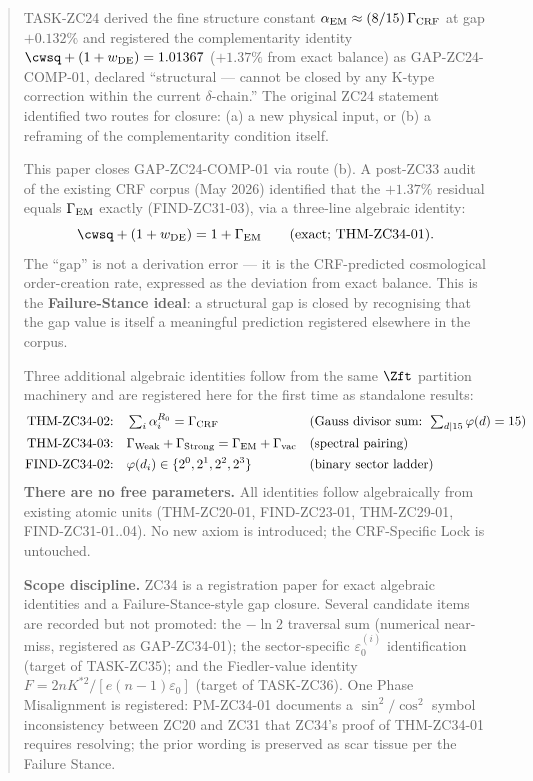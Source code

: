 \documentclass[12pt, a4paper]{article}
\begin{document}
\begin{abstract}
\sloppy
TASK-ZC24 derived the fine structure constant
$\alpha_{\rm EM} \approx (8/15)\,\Gamma_{\rm CRF}$ at gap $+0.132\%$
and registered the complementarity identity
$\cwsq + (1+w_{\rm DE}) = 1.01367$ ($+1.37\%$ from exact balance)
as GAP-ZC24-COMP-01, declared ``structural --- cannot be closed
by any K-type correction within the current $\delta$-chain.''
The original ZC24 statement identified two routes for closure:
(a) a new physical input, or (b) a reframing of the
complementarity condition itself.

This paper closes GAP-ZC24-COMP-01 via route (b). A
post-ZC33 audit of the existing CRF corpus (May 2026)
identified that the $+1.37\%$ residual equals
$\Gamma_{\rm EM}$ exactly
(FIND-ZC31-03), via a three-line algebraic identity:
\[
  \cwsq + (1+w_{\rm DE}) = 1 + \Gamma_{\rm EM}
  \qquad\text{(exact; THM-ZC34-01)}.
\]
The ``gap'' is not a derivation error --- it is the
CRF-predicted cosmological order-creation rate, expressed as
the deviation from exact balance. This is the
\textbf{Failure-Stance ideal}: a structural gap is closed by
recognising that the gap value is itself a meaningful
prediction registered elsewhere in the corpus.

Three additional algebraic identities follow from the same
$\Zft$ partition machinery and are registered here for the
first time as standalone results:
\begin{align*}
  \text{THM-ZC34-02:}\quad
    & \textstyle\sum_{i}\alpha_i^{R_0} = \Gamma_{\rm CRF}
    && (\text{Gauss divisor sum: }
       \textstyle\sum_{d|15}\varphi(d) = 15) \\
  \text{THM-ZC34-03:}\quad
    & \Gamma_{\rm Weak} + \Gamma_{\rm Strong}
    = \Gamma_{\rm EM} + \Gamma_{\rm vac}
    && (\text{spectral pairing}) \\
  \text{FIND-ZC34-02:}\quad
    & \varphi(d_i) \in \{2^0, 2^1, 2^2, 2^3\}
    && (\text{binary sector ladder})
\end{align*}
\textbf{There are no free parameters.} All identities follow
algebraically from existing atomic units (THM-ZC20-01,
FIND-ZC23-01, THM-ZC29-01, FIND-ZC31-01..04). No new axiom is
introduced; the CRF-Specific Lock is untouched.

\textbf{Scope discipline.} ZC34 is a registration paper for
exact algebraic identities and a Failure-Stance-style gap
closure. Several candidate items are recorded but not
promoted: the $-\ln 2$ traversal sum (numerical near-miss,
registered as GAP-ZC34-01); the sector-specific $\varepsilon_0^{(i)}$
identification (target of TASK-ZC35); and the Fiedler-value
identity $F = 2nK^{*2}/[e(n-1)\varepsilon_0]$ (target of
TASK-ZC36). One Phase Misalignment is registered: PM-ZC34-01
documents a $\sin^2/\cos^2$ symbol inconsistency between
ZC20 and ZC31 that ZC34's proof of THM-ZC34-01 requires
resolving; the prior wording is preserved as scar tissue
per the Failure Stance.
\end{abstract}
\end{document}
